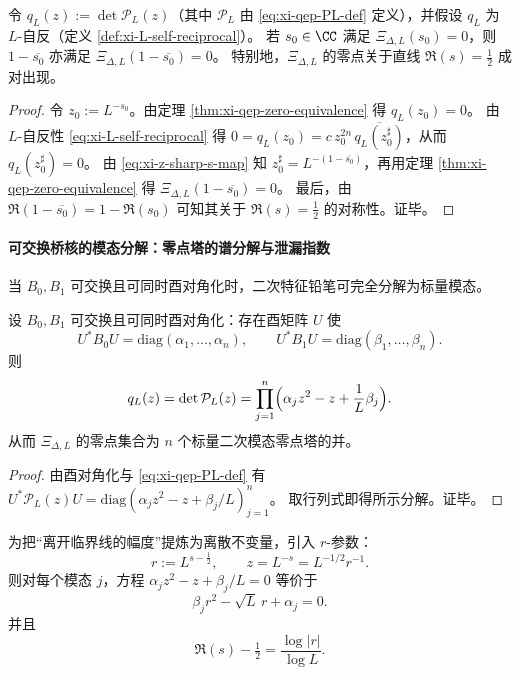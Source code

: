 \begin{theorem}\label{thm:xi-L-reciprocal-implies-critical-pairing}
令 \(q_L(z):=\det \mathcal{P}_L(z)\)（其中 \(\mathcal{P}_L\) 由 \eqref{eq:xi-qep-PL-def} 定义），并假设 \(q_L\) 为 \(L\)-自反（定义 \ref{def:xi-L-self-reciprocal}）。
若 \(s_0\in\CC\) 满足 \(\Xi_{\Delta,L}(s_0)=0\)，则 \(1-\overline{s_0}\) 亦满足 \(\Xi_{\Delta,L}(1-\overline{s_0})=0\)。
特别地，\(\Xi_{\Delta,L}\) 的零点关于直线 \(\Re(s)=\tfrac12\) 成对出现。
\end{theorem}

\begin{proof}
令 \(z_0:=L^{-s_0}\)。由定理 \ref{thm:xi-qep-zero-equivalence} 得 \(q_L(z_0)=0\)。
由 \(L\)-自反性 \eqref{eq:xi-L-self-reciprocal} 得
\(
0=q_L(z_0)=c\,z_0^{2n}\,\overline{q_L(z_0^\sharp)}
\)，从而 \(q_L(z_0^\sharp)=0\)。
由 \eqref{eq:xi-z-sharp-s-map} 知 \(z_0^\sharp=L^{-(1-\overline{s_0})}\)，再用定理 \ref{thm:xi-qep-zero-equivalence} 得 \(\Xi_{\Delta,L}(1-\overline{s_0})=0\)。
最后，由 \(\Re(1-\overline{s_0})=1-\Re(s_0)\) 可知其关于 \(\Re(s)=\tfrac12\) 的对称性。证毕。
\end{proof}

\paragraph{可交换桥核的模态分解：零点塔的谱分解与泄漏指数}
当 \(B_0,B_1\) 可交换且可同时酉对角化时，二次特征铅笔可完全分解为标量模态。

\begin{proposition}[可交换桥核的模态分解]\label{prop:xi-qep-commuting-modal-factorization}
设 \(B_0,B_1\) 可交换且可同时酉对角化：存在酉矩阵 \(U\) 使
\[
U^\ast B_0U=\mathrm{diag}(\alpha_1,\dots,\alpha_n),
\qquad
U^\ast B_1U=\mathrm{diag}(\beta_1,\dots,\beta_n).
\]
则
\[
q_L(z)=\det \mathcal{P}_L(z)=\prod_{j=1}^n\Bigl(\alpha_j z^2-z+\frac1L\beta_j\Bigr).
\]
从而 \(\Xi_{\Delta,L}\) 的零点集合为 \(n\) 个标量二次模态零点塔的并。
\end{proposition}

\begin{proof}
由酉对角化与 \eqref{eq:xi-qep-PL-def} 有
\(
U^\ast \mathcal{P}_L(z)U=\mathrm{diag}(\alpha_j z^2-z+\beta_j/L)_{j=1}^n
\)。
取行列式即得所示分解。证毕。
\end{proof}

为把“离开临界线的幅度”提炼为离散不变量，引入 \(r\)-参数：
\begin{equation}\label{eq:xi-qep-r-def}
r:=L^{s-\tfrac12},
\qquad
z=L^{-s}=L^{-1/2}r^{-1}.
\end{equation}
则对每个模态 \(j\)，方程 \(\alpha_j z^2-z+\beta_j/L=0\) 等价于
\begin{equation}\label{eq:xi-qep-mode-r-quadratic}
\beta_j r^2-\sqrt L\,r+\alpha_j=0.
\end{equation}
并且
\begin{equation}\label{eq:xi-qep-re-shift-by-r}
\Re(s)-\tfrac12=\frac{\log|r|}{\log L}.
\end{equation}

